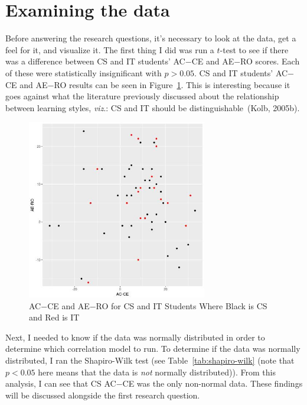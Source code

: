 \section{Examining the data}
Before answering the research questions, it's necessary to look at the data, get a feel for it, and visualize it. The first thing I did was run a $t$-test to see if there was a difference between CS and IT students' AC$-$CE and AE$-$RO scores. Each of these were statistically insignificant with $p>0.05$. CS and IT students' AC$-$CE and AE$-$RO results can be seen in Figure~\ref{fig:cs-v-it-plot}. This is interesting because it goes against what the literature previously discussed about the relationship between learning styles, \textit{viz}.: CS and IT should be distinguishable~(Kolb, 2005b).

\begin{figure}[!bhtb]
  \centering
  \includegraphics[width=0.7\textwidth]{figures/chapter4/cs-v-it-plot.jpg}
  \caption[AC$-$CE and AE$-$RO for CS and IT Students]{AC$-$CE and AE$-$RO for CS and IT Students Where Black is CS and Red is IT}
  \label{fig:cs-v-it-plot}
\end{figure}

Next, I needed to know if the data was normally distributed in order to determine which correlation model to run. To determine if the data was normally distributed, I ran the Shapiro-Wilk test (see Table~\ref{tab:shapiro-wilk} (note that $p<0.05$ here means that the data is \emph{not} normally distributed)). From this analysis, I can see that CS AC$-$CE was the only non-normal data. These findings will be discussed alongside the first research question.

